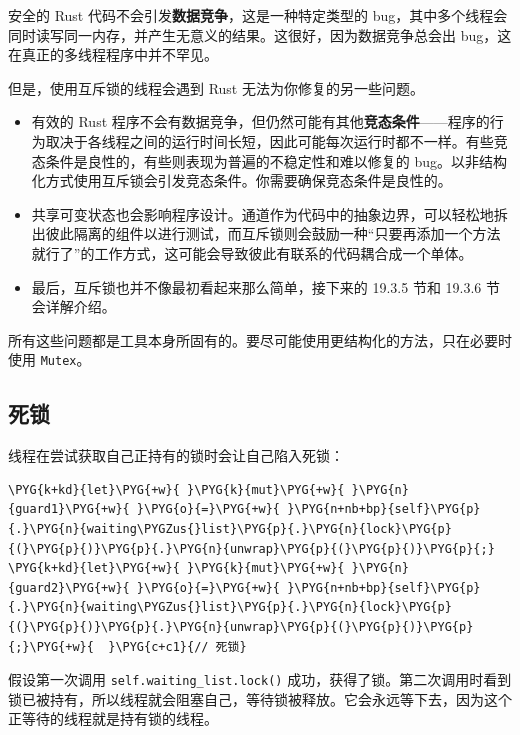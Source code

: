 安全的 Rust 代码不会引发\textbf{数据竞争}，这是一种特定类型的 bug，其中多个线程会同时读写同一内存，并产生无意义的结果。这很好，因为数据竞争总会出 bug，这在真正的多线程程序中并不罕见。

但是，使用互斥锁的线程会遇到 Rust 无法为你修复的另一些问题。

\begin{itemize}
\item 有效的 Rust 程序不会有数据竞争，但仍然可能有其他\textbf{竞态条件}——程序的行为取决于各线程之间的运行时间长短，因此可能每次运行时都不一样。有些竞态条件是良性的，有些则表现为普遍的不稳定性和难以修复的 bug。以非结构化方式使用互斥锁会引发竞态条件。你需要确保竞态条件是良性的。
\item 共享可变状态也会影响程序设计。通道作为代码中的抽象边界，可以轻松地拆出彼此隔离的组件以进行测试，而互斥锁则会鼓励一种“只要再添加一个方法就行了”的工作方式，这可能会导致彼此有联系的代码耦合成一个单体。
\item 最后，互斥锁也并不像最初看起来那么简单，接下来的 19.3.5 节和 19.3.6 节会详解介绍。
\end{itemize}

所有这些问题都是工具本身所固有的。要尽可能使用更结构化的方法，只在必要时使用 \texttt{Mutex}。

\subsection{死锁}

线程在尝试获取自己正持有的锁时会让自己陷入死锁：

\begin{Verbatim}[commandchars=\\\{\},breaklines=true,breakanywhere=true,fontsize=\codefont,xleftmargin=17bp]
\PYG{k+kd}{let}\PYG{+w}{ }\PYG{k}{mut}\PYG{+w}{ }\PYG{n}{guard1}\PYG{+w}{ }\PYG{o}{=}\PYG{+w}{ }\PYG{n+nb+bp}{self}\PYG{p}{.}\PYG{n}{waiting\PYGZus{}list}\PYG{p}{.}\PYG{n}{lock}\PYG{p}{(}\PYG{p}{)}\PYG{p}{.}\PYG{n}{unwrap}\PYG{p}{(}\PYG{p}{)}\PYG{p}{;}
\PYG{k+kd}{let}\PYG{+w}{ }\PYG{k}{mut}\PYG{+w}{ }\PYG{n}{guard2}\PYG{+w}{ }\PYG{o}{=}\PYG{+w}{ }\PYG{n+nb+bp}{self}\PYG{p}{.}\PYG{n}{waiting\PYGZus{}list}\PYG{p}{.}\PYG{n}{lock}\PYG{p}{(}\PYG{p}{)}\PYG{p}{.}\PYG{n}{unwrap}\PYG{p}{(}\PYG{p}{)}\PYG{p}{;}\PYG{+w}{  }\PYG{c+c1}{// 死锁}
\end{Verbatim}

假设第一次调用 \texttt{self.waiting\_list.lock()} 成功，获得了锁。第二次调用时看到锁已被持有，所以线程就会阻塞自己，等待锁被释放。它会永远等下去，因为这个正等待的线程就是持有锁的线程。

